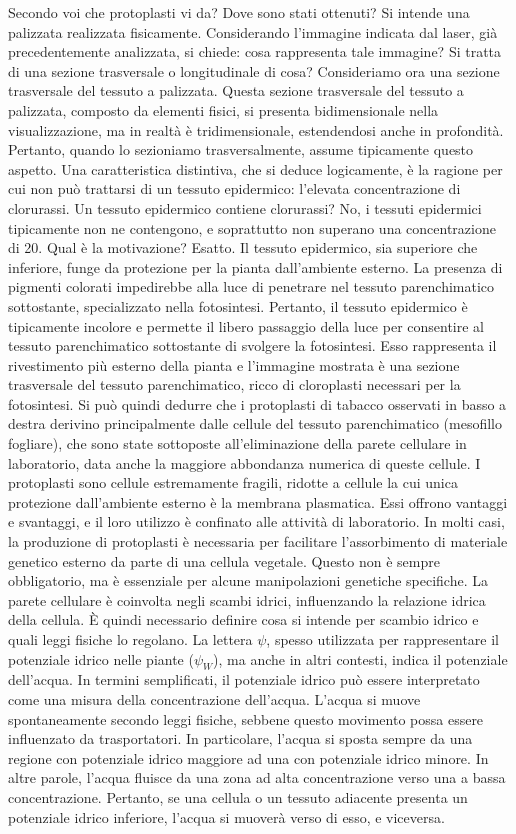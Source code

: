 \documentclass[11pt, a4paper]{article}
\begin{document}
\begin{spacing}{1}
Secondo voi che protoplasti vi da? Dove sono stati ottenuti? 
Si intende una palizzata realizzata fisicamente. Considerando l'immagine indicata dal laser, già precedentemente analizzata, si chiede: cosa rappresenta tale immagine? Si tratta di una sezione trasversale o longitudinale di cosa?
Consideriamo ora una sezione trasversale del tessuto a palizzata. Questa sezione trasversale del tessuto a palizzata, composto da elementi fisici, si presenta bidimensionale nella visualizzazione, ma in realtà è tridimensionale, estendendosi anche in profondità. Pertanto, quando lo sezioniamo trasversalmente, assume tipicamente questo aspetto.
Una caratteristica distintiva, che si deduce logicamente, è la ragione per cui non può trattarsi di un tessuto epidermico: l'elevata concentrazione di clorurassi. Un tessuto epidermico contiene clorurassi? No, i tessuti epidermici tipicamente non ne contengono, e soprattutto non superano una concentrazione di 20. Qual è la motivazione? Esatto.
Il tessuto epidermico, sia superiore che inferiore, funge da protezione per la pianta dall'ambiente esterno. La presenza di pigmenti colorati impedirebbe alla luce di penetrare nel tessuto parenchimatico sottostante, specializzato nella fotosintesi. Pertanto, il tessuto epidermico è tipicamente incolore e permette il libero passaggio della luce per consentire al tessuto parenchimatico sottostante di svolgere la fotosintesi. Esso rappresenta il rivestimento più esterno della pianta e l'immagine mostrata è una sezione trasversale del tessuto parenchimatico, ricco di cloroplasti necessari per la fotosintesi. Si può quindi dedurre che i protoplasti di tabacco osservati in basso a destra derivino principalmente dalle cellule del tessuto parenchimatico (mesofillo fogliare), che sono state sottoposte all'eliminazione della parete cellulare in laboratorio, data anche la maggiore abbondanza numerica di queste cellule.
I protoplasti sono cellule estremamente fragili, ridotte a cellule la cui unica protezione dall'ambiente esterno è la membrana plasmatica. Essi offrono vantaggi e svantaggi, e il loro utilizzo è confinato alle attività di laboratorio. In molti casi, la produzione di protoplasti è necessaria per facilitare l'assorbimento di materiale genetico esterno da parte di una cellula vegetale. Questo non è sempre obbligatorio, ma è essenziale per alcune manipolazioni genetiche specifiche. La parete cellulare è coinvolta negli scambi idrici, influenzando la relazione idrica della cellula. È quindi necessario definire cosa si intende per scambio idrico e quali leggi fisiche lo regolano.
La lettera $\psi$, spesso utilizzata per rappresentare il potenziale idrico nelle piante ($\psi_{W}$), ma anche in altri contesti, indica il potenziale dell'acqua. In termini semplificati, il potenziale idrico può essere interpretato come una misura della concentrazione dell'acqua. L'acqua si muove spontaneamente secondo leggi fisiche, sebbene questo movimento possa essere influenzato da trasportatori. In particolare, l'acqua si sposta sempre da una regione con potenziale idrico maggiore ad una con potenziale idrico minore. In altre parole, l'acqua fluisce da una zona ad alta concentrazione verso una a bassa concentrazione. Pertanto, se una cellula o un tessuto adiacente presenta un potenziale idrico inferiore, l'acqua si muoverà verso di esso, e viceversa.

\end{spacing}
\end{document}
